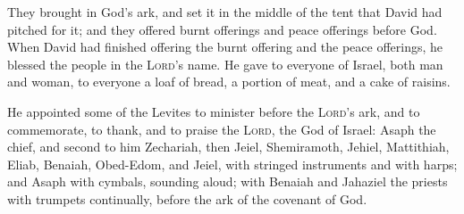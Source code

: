  They brought in God's ark, and set it in the middle of
the tent that David had pitched for it; and they offered burnt offerings
and peace offerings before God.  When David had finished
offering the burnt offering and the peace offerings, he blessed the
people in the \textsc{Lord}'s name.  He gave to everyone
of Israel, both man and woman, to everyone a loaf of bread, a portion of
meat, and a cake of raisins.

 He appointed some of the Levites to minister before the
\textsc{Lord}'s ark, and to commemorate, to thank, and to praise the
\textsc{Lord}, the God of Israel:  Asaph the chief, and
second to him Zechariah, then Jeiel, Shemiramoth, Jehiel, Mattithiah,
Eliab, Benaiah, Obed-Edom, and Jeiel, with stringed instruments and with
harps; and Asaph with cymbals, sounding aloud;  with
Benaiah and Jahaziel the priests with trumpets continually, before the
ark of the covenant of God.

